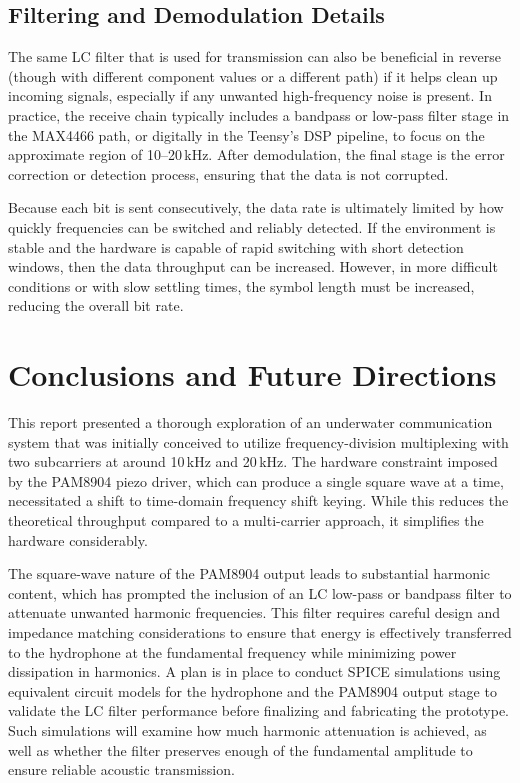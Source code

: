 \section{Filtering and Demodulation Details}

The same LC filter that is used for transmission can also be beneficial in reverse (though with different component values or a different path) if it helps clean up incoming signals, especially if any unwanted high-frequency noise is present. In practice, the receive chain typically includes a bandpass or low-pass filter stage in the MAX4466 path, or digitally in the Teensy's DSP pipeline, to focus on the approximate region of 10--20\,kHz. After demodulation, the final stage is the error correction or detection process, ensuring that the data is not corrupted. 

Because each bit is sent consecutively, the data rate is ultimately limited by how quickly frequencies can be switched and reliably detected. If the environment is stable and the hardware is capable of rapid switching with short detection windows, then the data throughput can be increased. However, in more difficult conditions or with slow settling times, the symbol length must be increased, reducing the overall bit rate.

\chapter{Conclusions and Future Directions}

This report presented a thorough exploration of an underwater communication system that was initially conceived to utilize frequency-division multiplexing with two subcarriers at around 10\,kHz and 20\,kHz. The hardware constraint imposed by the PAM8904 piezo driver, which can produce a single square wave at a time, necessitated a shift to time-domain frequency shift keying. While this reduces the theoretical throughput compared to a multi-carrier approach, it simplifies the hardware considerably. 

The square-wave nature of the PAM8904 output leads to substantial harmonic content, which has prompted the inclusion of an LC low-pass or bandpass filter to attenuate unwanted harmonic frequencies. This filter requires careful design and impedance matching considerations to ensure that energy is effectively transferred to the hydrophone at the fundamental frequency while minimizing power dissipation in harmonics. A plan is in place to conduct SPICE simulations using equivalent circuit models for the hydrophone and the PAM8904 output stage to validate the LC filter performance before finalizing and fabricating the prototype. Such simulations will examine how much harmonic attenuation is achieved, as well as whether the filter preserves enough of the fundamental amplitude to ensure reliable acoustic transmission.

